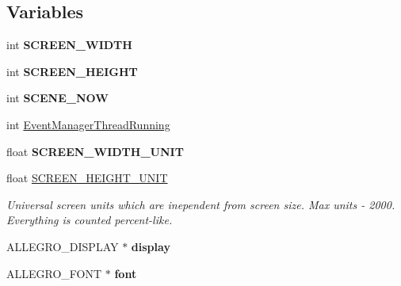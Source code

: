 \subsection*{Variables}
\begin{DoxyCompactItemize}
\item 
\mbox{\label{group___library_merger_ga599adbe412c60e0cc5abb86be7ee4507}} 
int {\bfseries S\+C\+R\+E\+E\+N\+\_\+\+W\+I\+D\+TH}
\item 
\mbox{\label{group___library_merger_gaf1c710caf1e3a9e81829078054e83799}} 
int {\bfseries S\+C\+R\+E\+E\+N\+\_\+\+H\+E\+I\+G\+HT}
\item 
\mbox{\label{group___library_merger_ga869b5af4da79e3acdab70d05679093c7}} 
int {\bfseries S\+C\+E\+N\+E\+\_\+\+N\+OW}
\item 
int \hyperlink{group___library_merger_ga1318fa5effb70983960c09c162701742}{Event\+Manager\+Thread\+Running}
\item 
\mbox{\label{group___library_merger_ga8425d17a7c34516b1047f12c3b0e3d17}} 
float {\bfseries S\+C\+R\+E\+E\+N\+\_\+\+W\+I\+D\+T\+H\+\_\+\+U\+N\+IT}
\item 
\mbox{\label{group___library_merger_gac4c0057b3db1dab613cee945f3e0c8cd}} 
float \hyperlink{group___library_merger_gac4c0057b3db1dab613cee945f3e0c8cd}{S\+C\+R\+E\+E\+N\+\_\+\+H\+E\+I\+G\+H\+T\+\_\+\+U\+N\+IT}
\begin{DoxyCompactList}\small\item\em Universal screen units which are inependent from screen size. Max units -\/ 2000. Everything is counted percent-\/like. \end{DoxyCompactList}\item 
\mbox{\label{group___library_merger_gaf64cc6c8a47e5ddbf510b5aa92e062b9}} 
A\+L\+L\+E\+G\+R\+O\+\_\+\+D\+I\+S\+P\+L\+AY $\ast$ {\bfseries display}
\item 
\mbox{\label{group___library_merger_gae4254615de94af5fc74d43e8b676dcf9}} 
A\+L\+L\+E\+G\+R\+O\+\_\+\+F\+O\+NT $\ast$ {\bfseries font}
\item 
\mbox{\label{group___library_merger_ga18d30843d40a57148bbfacc9cf1ef055}} 

\end{DoxyCompactItemize}
